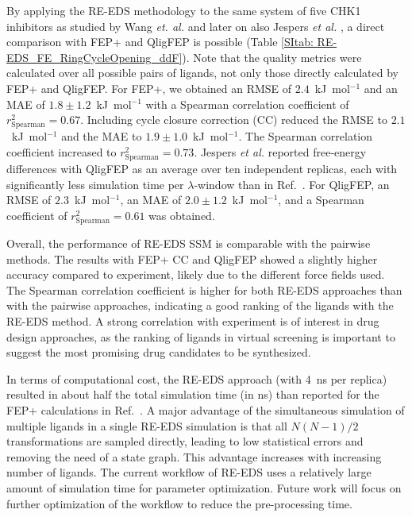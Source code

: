 By applying the RE-EDS methodology to the same system of five CHK1 inhibitors as studied by Wang \textit{et. al.} \cite{Wang2017} and later on also Jespers \textit{et al.} \cite{Jespers2019}, a direct comparison with FEP+ and QligFEP is possible (Table \ref{SItab: RE-EDS_FE_RingCycleOpening_ddF}). Note that the quality metrics were calculated over all possible pairs of ligands, not only those directly calculated by FEP+ and QligFEP.
For FEP+, we obtained an RMSE of $2.4$~kJ~mol$^{-1}$ and an MAE of $1.8 \pm 1.2$~kJ~mol$^{-1}$ with a Spearman correlation coefficient of $r^2_{\text{Spearman}}=0.67$.
Including cycle closure correction (CC) \cite{Wang2017} reduced the RMSE to $2.1$~kJ~mol$^{-1}$ and the MAE to $1.9 \pm 1.0$~kJ~mol$^{-1}$. The Spearman correlation coefficient increased to $r^2_{\text{Spearman}}=0.73$.
Jespers \textit{et al.} \cite{Jespers2019} reported free-energy differences with QligFEP as an average over ten independent replicas, each with significantly less simulation time per $\lambda$-window than in Ref.~\cite{Wang2017}. For QligFEP, an RMSE of $2.3$~kJ~mol$^{-1}$, an MAE of $2.0 \pm 1.2$~kJ~mol$^{-1}$, and a Spearman coefficient of $r^2_{\text{Spearman}}=0.61$ was obtained.

Overall, the performance of RE-EDS SSM is comparable with the pairwise methods. The results with FEP+ CC and QligFEP showed a slightly higher accuracy compared to experiment, likely due to the different force fields used. The Spearman correlation coefficient is higher for both RE-EDS approaches than with the pairwise approaches, indicating a good ranking of the ligands with the RE-EDS method.
A strong correlation with experiment is of interest in drug design approaches, as the ranking of ligands in virtual screening is important to suggest the most promising drug candidates to be synthesized.

In terms of computational cost, the RE-EDS approach (with 4~ns per replica) resulted in about half the total simulation time (in ns) than reported for the FEP+ calculations in Ref.~\cite{Wang2017}. A major advantage of the simultaneous simulation of multiple ligands in a single RE-EDS simulation is that all $N(N-1)/2$ transformations are sampled directly, leading to low statistical errors and removing the need of a state graph. This advantage increases with increasing number of ligands. The current workflow of RE-EDS uses a relatively large amount of simulation time for parameter optimization. Future work will focus on further optimization of the workflow to reduce the pre-processing time. 

